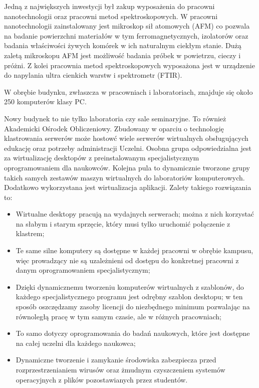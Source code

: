 ﻿\documentclass[a4paper,12pt]{article}
\begin{document}
Jedną z największych inwestycji był zakup wyposażenia do pracowni nanotechnologii oraz pracowni metod
spektroskopowych. W pracowni nanotechnologii zainstalowany jest mikroskop sił atomowych (AFM) co
pozwala na badanie powierzchni materiałów w tym ferromagnetycznych, izolatorów oraz badania właściwości
żywych komórek w ich naturalnym ciekłym stanie. Dużą zaletą mikroskopu AFM jest możliwość badania
próbek w powietrzu, cieczy i próżni. Z kolei pracownia metod spektroskopowych wyposażona jest w
urządzenie do napylania ultra cienkich warstw i spektrometr (FTIR).
\par
W obrębie budynku, zwłaszcza w pracowniach i laboratoriach, znajduje się około 250 komputerów klasy PC.
\par
Nowy budynek to nie tylko laboratoria czy sale seminaryjne. To również Akademicki Ośrodek Obliczeniowy.
Zbudowany w oparciu o technologię klastrowania serwerów może hostowć wiele serwerów wirtualnych
obsługujących edukację oraz potrzeby administracji Uczelni. Osobna grupa odpowiedzialna jest za
wirtualizację desktopów z preinstalowanym specjalistycznym oprogramowaniem dla naukowców. Kolejna pula
to dynamicznie tworzone grupy takich samych zestawów maszyn wirtualnych do laboratoriów
komputerowych. Dodatkowo wykorzystana jest wirtualizacja aplikacji. Zalety takiego rozwiązania to:
\begin {itemize}
\item Wirtualne desktopy pracują na wydajnych serwerach; można z nich korzystać na słabym i starym
sprzęcie, który musi tylko uruchomić połączenie z klastrem;
\item Te same silne komputery są dostępne w każdej pracowni w obrębie kampusu, więc prowadzący nie są
uzależnieni od dostępu do konkretnej pracowni z danym oprogramowaniem specjalistycznym;
\item Dzięki dynamicznemu tworzeniu komputerów wirtualnych z szablonów, do każdego specjalistycznego
programu jest odrębny szablon desktopu; w ten sposób oszczędzamy zasoby licencji do niezbędnego
minimum pozwalając na równoległą pracę w tym samym czasie, ale w różnych pracowniach;
\item To samo dotyczy oprogramowania do badań naukowych, które jest dostępne na całej uczelni dla każdego
naukowca;
\item Dynamiczne tworzenie i zamykanie środowiska zabezpiecza przed rozprzestrzenianiem wirusów oraz
żmudnym czyszczeniem systemów operacyjnych z plików pozostawianych przez studentów.
\end{itemize}
\end{document}
